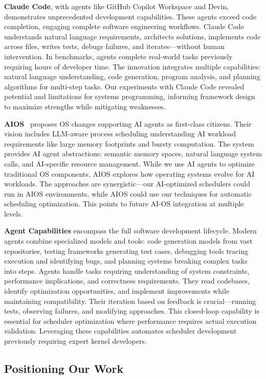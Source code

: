 \textbf{Claude Code}, with agents like GitHub Copilot Workspace and Devin, demonstrates unprecedented development capabilities. These agents exceed code completion, engaging complete software engineering workflows. Claude Code understands natural language requirements, architects solutions, implements code across files, writes tests, debugs failures, and iterates—without human intervention. In benchmarks, agents complete real-world tasks previously requiring hours of developer time. The innovation integrates multiple capabilities: natural language understanding, code generation, program analysis, and planning algorithms for multi-step tasks. Our experiments with Claude Code revealed potential and limitations for systems programming, informing framework design to maximize strengths while mitigating weaknesses.

\textbf{AIOS}~\cite{mei2024aios} proposes OS changes supporting AI agents as first-class citizens. Their vision includes LLM-aware process scheduling understanding AI workload requirements like large memory footprints and bursty computation. The system provides AI agent abstractions: semantic memory spaces, natural language system calls, and AI-specific resource management. While we use AI agents to optimize traditional OS components, AIOS explores how operating systems evolve for AI workloads. The approaches are synergistic—our AI-optimized schedulers could run in AIOS environments, while AIOS could use our techniques for automatic scheduling optimization. This points to future AI-OS integration at multiple levels.

\textbf{Agent Capabilities} encompass the full software development lifecycle. Modern agents combine specialized models and tools: code generation models from vast repositories, testing frameworks generating test cases, debugging tools tracing execution and identifying bugs, and planning systems breaking complex tasks into steps. Agents handle tasks requiring understanding of system constraints, performance implications, and correctness requirements. They read codebases, identify optimization opportunities, and implement improvements while maintaining compatibility. Their iteration based on feedback is crucial—running tests, observing failures, and modifying approaches. This closed-loop capability is essential for scheduler optimization where performance requires actual execution validation. Leveraging these capabilities automates scheduler development previously requiring expert kernel developers.

\subsection{Positioning Our Work}

